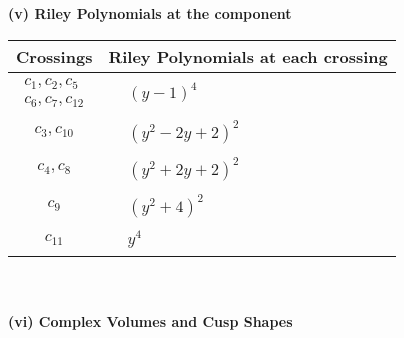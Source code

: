 \documentclass[1p]{elsarticle_modified}
\theoremstyle{definition}
\begin{document}
\newpage\renewcommand{\arraystretch}{1}
\flushleft \textbf{(v) Riley Polynomials at the component}\newline \\
\begin{tabular}{m{50pt}|m{274pt}}
Crossings & \hspace{64pt}Riley Polynomials at each crossing \\
\hline $$\begin{aligned}c_{1},c_{2},c_{5}\\c_{6},c_{7},c_{12}\end{aligned}$$&$\begin{aligned}
&(y-1)^4
\end{aligned}$\\
\hline $$\begin{aligned}c_{3},c_{10}\end{aligned}$$&$\begin{aligned}
&(y^2-2 y+2)^2
\end{aligned}$\\
\hline $$\begin{aligned}c_{4},c_{8}\end{aligned}$$&$\begin{aligned}
&(y^2+2 y+2)^2
\end{aligned}$\\
\hline $$\begin{aligned}c_{9}\end{aligned}$$&$\begin{aligned}
&(y^2+4)^2
\end{aligned}$\\
\hline $$\begin{aligned}c_{11}\end{aligned}$$&$\begin{aligned}
&y^4
\end{aligned}$\\
\hline
\end{tabular}\\~\\
\newpage\flushleft \textbf{(vi) Complex Volumes and Cusp Shapes}
\end{document}
